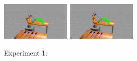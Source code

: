 \begin{center}
\begin{figure}[H]
\includegraphics[width=0.3\textwidth]{images/robot_planner1/robot_planner1_8}
\includegraphics[width=0.3\textwidth]{images/robot_planner1/robot_planner1_9}\\
\caption{Experiment 1:}
\end{figure}
\end{center}

